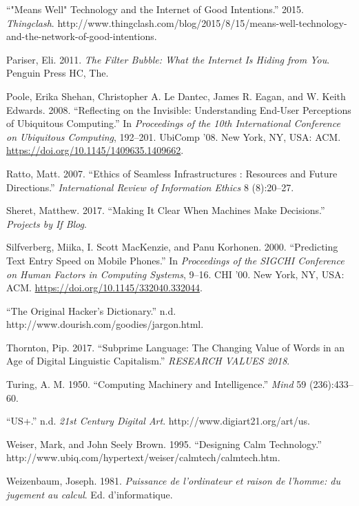 \documentclass[]{article}
\begin{document}
\leavevmode\hypertarget{ref-2015}{}%
``"Means Well" Technology and the Internet of Good Intentions.'' 2015.
\emph{Thingclash}.
http://www.thingclash.com/blog/2015/8/15/means-well-technology-and-the-network-of-good-intentions.

\leavevmode\hypertarget{ref-Pariser2011}{}%
Pariser, Eli. 2011. \emph{The Filter Bubble: What the Internet Is Hiding
from You}. Penguin Press HC, The.

\leavevmode\hypertarget{ref-Poole2008}{}%
Poole, Erika Shehan, Christopher A. Le Dantec, James R. Eagan, and W.
Keith Edwards. 2008. ``Reflecting on the Invisible: Understanding
End-User Perceptions of Ubiquitous Computing.'' In \emph{Proceedings of
the 10th International Conference on Ubiquitous Computing}, 192--201.
UbiComp '08. New York, NY, USA: ACM.
\url{https://doi.org/10.1145/1409635.1409662}.

\leavevmode\hypertarget{ref-Ratto2007}{}%
Ratto, Matt. 2007. ``Ethics of Seamless Infrastructures : Resources and
Future Directions.'' \emph{International Review of Information Ethics} 8
(8):20--27.

\leavevmode\hypertarget{ref-Sheret2017}{}%
Sheret, Matthew. 2017. ``Making It Clear When Machines Make Decisions.''
\emph{Projects by If Blog}.

\leavevmode\hypertarget{ref-Silfverberg2000}{}%
Silfverberg, Miika, I. Scott MacKenzie, and Panu Korhonen. 2000.
``Predicting Text Entry Speed on Mobile Phones.'' In \emph{Proceedings
of the SIGCHI Conference on Human Factors in Computing Systems}, 9--16.
CHI '00. New York, NY, USA: ACM.
\url{https://doi.org/10.1145/332040.332044}.

\leavevmode\hypertarget{ref-zotero-52}{}%
``The Original Hacker's Dictionary.'' n.d.
http://www.dourish.com/goodies/jargon.html.

\leavevmode\hypertarget{ref-Thornton2017}{}%
Thornton, Pip. 2017. ``Subprime Language: The Changing Value of Words in
an Age of Digital Linguistic Capitalism.'' \emph{RESEARCH VALUES 2018}.

\leavevmode\hypertarget{ref-Turing1950}{}%
Turing, A. M. 1950. ``Computing Machinery and Intelligence.''
\emph{Mind} 59 (236):433--60.

\leavevmode\hypertarget{ref-zotero-30}{}%
``US+.'' n.d. \emph{21st Century Digital Art}.
http://www.digiart21.org/art/us.

\leavevmode\hypertarget{ref-Weiser1995}{}%
Weiser, Mark, and John Seely Brown. 1995. ``Designing Calm Technology.''
http://www.ubiq.com/hypertext/weiser/calmtech/calmtech.htm.

\leavevmode\hypertarget{ref-Weizenbaum1981}{}%
Weizenbaum, Joseph. 1981. \emph{Puissance de l'ordinateur et raison de
l'homme: du jugement au calcul}. Ed. d'informatique.
\end{document}
